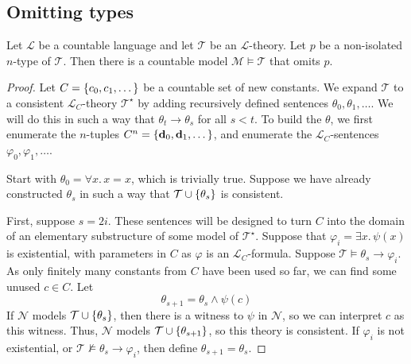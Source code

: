 \subsection{Omitting types}
\begin{theorem}
    Let \( \mathcal L \) be a countable language and let \( \mathcal T \) be an \( \mathcal L \)-theory.
    Let \( p \) be a non-isolated \( n \)-type of \( \mathcal T \).
    Then there is a countable model \( \mathcal M \vDash \mathcal T \) that omits \( p \).
\end{theorem}
\begin{proof}
    Let \( C = \qty{c_0, c_1, \dots} \) be a countable set of new constants.
    We expand \( \mathcal T \) to a consistent \( \mathcal L_C \)-theory \( \mathcal T^\star \) by adding recursively defined sentences \( \theta_0, \theta_1, \dots \).
    We will do this in such a way that \( \theta_t \to \theta_s \) for all \( s < t \).
    To build the \( \theta \), we first enumerate the \( n \)-tuples \( C^n = \qty{\vb d_0, \vb d_1, \dots} \), and enumerate the \( \mathcal L_C \)-sentences \( \varphi_0, \varphi_1, \dots \).

    Start with \( \theta_0 = \forall x.\, x = x \), which is trivially true.
    Suppose we have already constructed \( \theta_s \) in such a way that \( \mathcal T \cup \qty{\theta_s} \) is consistent.

    First, suppose \( s = 2i \).
    These sentences will be designed to turn \( C \) into the domain of an elementary substructure of some model of \( \mathcal T^\star \).
    Suppose that \( \varphi_i = \exists x.\, \psi(x) \) is existential, with parameters in \( C \) as \( \varphi \) is an \( \mathcal L_C \)-formula.
    Suppose \( \mathcal T \vDash \theta_s \to \varphi_i \).
    As only finitely many constants from \( C \) have been used so far, we can find some unused \( c \in C \).
    Let
    \[ \theta_{s + 1} = \theta_s \wedge \psi(c) \]
    If \( \mathcal N \) models \( \mathcal T \cup \qty{\theta_s} \), then there is a witness to \( \psi \) in \( \mathcal N \), so we can interpret \( c \) as this witness.
    Thus, \( \mathcal N \) models \( \mathcal T \cup \qty{\theta_{s+1}} \), so this theory is consistent.
    If \( \varphi_i \) is not existential, or \( \mathcal T \nvDash \theta_s \to \varphi_i \), then define \( \theta_{s + 1} = \theta_s \).


\end{proof}
